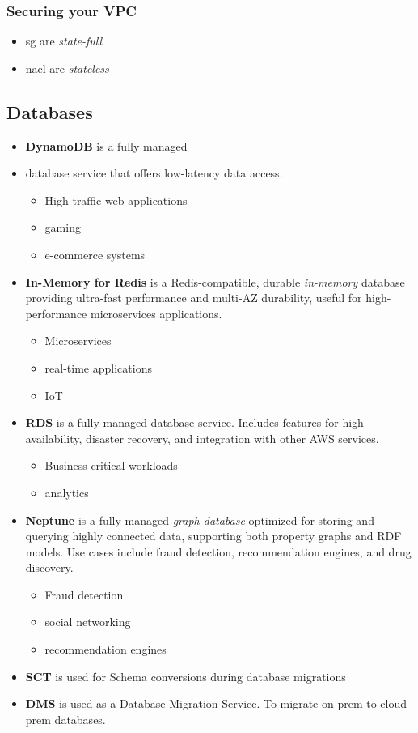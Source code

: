 \subsubsection{Securing your VPC}

\begin{itemize}
    \item \Gls{sg} are \textit{state-full}
    \item \Gls {nacl} are \textit{stateless}
\end{itemize}

\subsection{Databases}

\begin{itemize}
    \item \textbf{DynamoDB} is a fully managed \item  database service that offers low-latency data access.
    \begin{itemize}
        \item High-traffic web applications
        \item gaming
        \item e-commerce systems
    \end{itemize}
    \item \textbf{In-Memory for Redis} is a Redis-compatible, durable \textit{in-memory }database providing ultra-fast performance and multi-AZ durability, useful for high-performance microservices applications.
    \begin{itemize}
        \item Microservices
        \item real-time applications
        \item IoT
    \end{itemize}
    \item \textbf{RDS} is a fully managed database service. Includes features for high availability, disaster recovery, and integration with other AWS services.
    \begin{itemize}
        \item Business-critical workloads
        \item analytics
    \end{itemize}
    \item \textbf{Neptune} is a fully managed \textit{graph database} optimized for storing and querying highly connected data, supporting both property graphs and RDF models. Use cases include fraud detection, recommendation engines, and drug discovery.
    \begin{itemize}
        \item Fraud detection
        \item social networking
        \item recommendation engines
    \end{itemize}
    \item \textbf{SCT} is used for Schema conversions during database migrations
    \item \textbf{DMS} is used as a Database Migration Service. To migrate on-prem to cloud-prem databases.
\end{itemize}